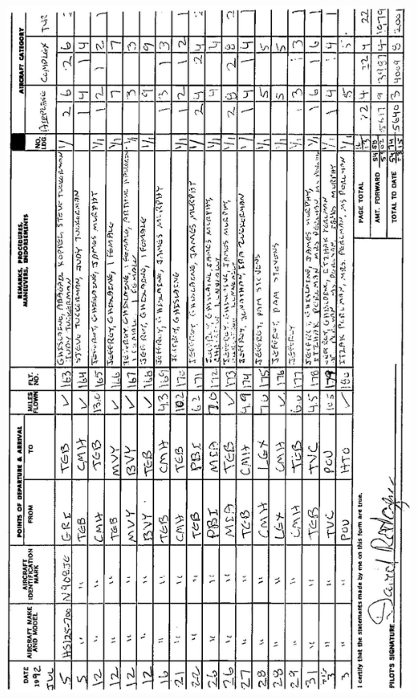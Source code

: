 \documentclass[10pt]{article}
\begin{document}
\includegraphics[max width=\textwidth, center]{2025_02_27_dd68c3d38de88f0516d9g-015(1)}
\end{document}
